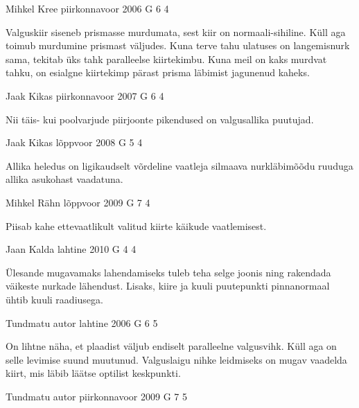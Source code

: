 \documentclass[11pt, twoside]{article}
\begin{document}
{%
{Mihkel Kree} %
{piirkonnavoor} %
{2006} %
{G 6} %
{4} %
{

\ifHint
Valguskiir siseneb prismasse murdumata, sest kiir on normaali-sihiline. Küll aga toimub murdumine prismast väljudes. Kuna terve tahu ulatuses on langemisnurk sama, tekitab üks tahk paralleelse kiirtekimbu. Kuna meil on kaks murdvat tahku, on esialgne kiirtekimp pärast prisma läbimist jagunenud kaheks.
\fi
}

{Jaak Kikas} %
{piirkonnavoor} %
{2007} %
{G 6} %
{4} %
{

\ifHint
Nii täis- kui poolvarjude piirjoonte pikendused on valgusallika puutujad.
\fi
}

{Jaak Kikas} %
{lõppvoor} %
{2008} %
{G 5} %
{4} %
{

\ifHint
Allika heledus on ligikaudselt võrdeline vaatleja silmaava nurkläbimõõdu ruuduga allika asukohast vaadatuna.
\fi
}

{Mihkel Rähn} %
{lõppvoor} %
{2009} %
{G 7} %
{4} %
{

\ifHint
Piisab kahe ettevaatlikult valitud kiirte käikude vaatlemisest.
\fi
}

{Jaan Kalda} %
{lahtine} %
{2010} %
{G 4} %
{4} %
{

\ifHint
Ülesande mugavamaks lahendamiseks tuleb teha selge joonis ning rakendada väikeste nurkade lähendust. Lisaks, kiire ja kuuli puutepunkti pinnanormaal ühtib kuuli raadiusega.
\fi
}

{Tundmatu autor} %
{lahtine} %
{2006} %
{G 6} %
{5} %
{

\ifHint
On lihtne näha, et plaadist väljub endiselt paralleelne valgusvihk. Küll aga on selle levimise suund muutunud. Valguslaigu nihke leidmiseks on mugav vaadelda kiirt, mis läbib läätse optilist keskpunkti.
\fi
}

{Tundmatu autor} %
{piirkonnavoor} %
{2009} %
{G 7} %
{5} %
{

}}
\end{document}
